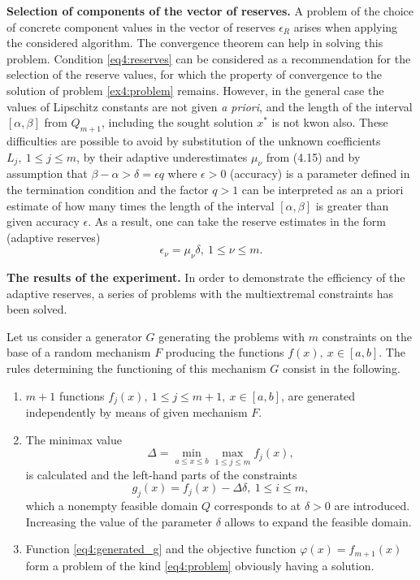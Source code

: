 \documentclass[graybox]{svmult}
\begin{document}
\textbf{Selection of components of the vector of reserves.} A problem of the choice of concrete component values in the vector of reserves $\epsilon_R$ arises when applying the considered algorithm.
The convergence theorem can help in solving this problem. Condition \eqref{eq4:reserves} can be considered as a recommendation for the selection of the reserve values, for which the property of
convergence to the solution of problem \eqref{ex4:problem} remains. However, in the general case the values of Lipschitz constants are not given \emph{a priori}, and the length of the interval $[\alpha,\beta]$ from $Q_{m + 1}$, including the sought solution $x^*$ is not kwon also. These difficulties are possible to avoid by
substitution of the unknown coefficients $L_j,\: 1\le j\le m$, by their adaptive underestimates $\mu_\nu$ from (4.15) and by assumption that $\beta-\alpha>\delta=\epsilon q$ where $\epsilon >0$ (accuracy) is a parameter defined in the termination condition and the factor $q>1$ can be interpreted as an a priori estimate of how many times the length of the interval $[\alpha,\beta]$ is greater than given accuracy $\epsilon$. As a result, one can take
the reserve estimates in the form (adaptive reserves)
\begin{displaymath}
  \epsilon_\nu=\mu_\nu\delta,\: 1\le\nu\le m.
\end{displaymath}

\textbf{The results of the experiment.} In order to demonstrate the efficiency of the adaptive reserves, a series of problems with the multiextremal constraints has been solved.

Let us consider a generator $G$ generating the problems with $m$ constraints on the base of a random mechanism $F$ producing the functions $f(x),\: x \in [ a , b ]$. The rules determining the
functioning of this mechanism $G$ consist in the following.
\begin{enumerate}
  \item $m+1$ functions $f_j(x),\: 1\le j \le m+1,\: x\in[a,b]$, are generated independently by means of given mechanism $F$.
  \item The minimax value
  \begin{displaymath}
    \Delta=\min_{a\le x\le b}\max_{1\le j\le m}f_j(x),
  \end{displaymath}
  is calculated and the left-hand parts of the constraints
  \begin{equation}
    \label{eq4:generated_g}
    g_j(x)=f_j(x)-\Delta\delta,\: 1\le i\le m,
  \end{equation}
  which a nonempty feasible domain $Q$ corresponds to at $\delta>0$ are introduced. Increasing the value of the parameter $\delta$ allows to expand the feasible domain.
  \item Function \eqref{eq4:generated_g} and the objective function $\varphi(x)=f_{m+1}( x )$ form a problem of the kind \eqref{eq4:problem} obviously having a solution.
\end{enumerate}
\end{document}
